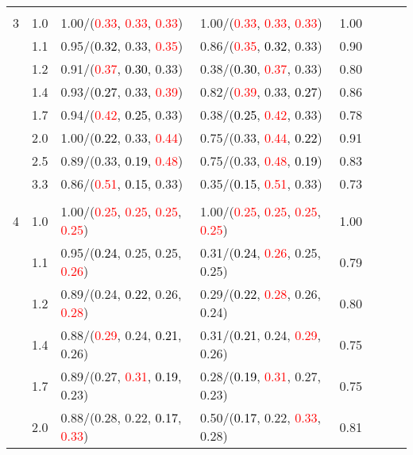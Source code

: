 \documentclass[10pt,a4paper]{report}
\begin{document}
\begin{table}[!htbp]
\begin{center}
{\begin{tabular}{ccllcccc}
			&&&&\\
			3			&1.0&1.00/(\textcolor{red}{0.33}, \textcolor{red}{0.33}, \textcolor{red}{0.33})&1.00/(\textcolor{red}{0.33}, \textcolor{red}{0.33}, \textcolor{red}{0.33})&1.00\\
			&1.1&0.95/(\textcolor{black}{0.32}, 0.33, \textcolor{red}{0.35})&0.86/(\textcolor{red}{0.35}, \textcolor{black}{0.32}, 0.33)&0.90\\
			&1.2&0.91/(\textcolor{red}{0.37}, \textcolor{black}{0.30}, 0.33)&0.38/(\textcolor{black}{0.30}, \textcolor{red}{0.37}, 0.33)&0.80\\
			&1.4&0.93/(\textcolor{black}{0.27}, 0.33, \textcolor{red}{0.39})&0.82/(\textcolor{red}{0.39}, 0.33, \textcolor{black}{0.27})&0.86\\
			&1.7&0.94/(\textcolor{red}{0.42}, \textcolor{black}{0.25}, 0.33)&0.38/(\textcolor{black}{0.25}, \textcolor{red}{0.42}, 0.33)&0.78\\
			&2.0&1.00/(\textcolor{black}{0.22}, 0.33, \textcolor{red}{0.44})&0.75/(0.33, \textcolor{red}{0.44}, \textcolor{black}{0.22})&0.91\\
			&2.5&0.89/(0.33, \textcolor{black}{0.19}, \textcolor{red}{0.48})&0.75/(0.33, \textcolor{red}{0.48}, \textcolor{black}{0.19})&0.83\\
			&3.3&0.86/(\textcolor{red}{0.51}, \textcolor{black}{0.15}, 0.33)&0.35/(\textcolor{black}{0.15}, \textcolor{red}{0.51}, 0.33)&0.73\\
			&&&&\\
			4			&1.0&1.00/(\textcolor{red}{0.25}, \textcolor{red}{0.25}, \textcolor{red}{0.25}, \textcolor{red}{0.25})&1.00/(\textcolor{red}{0.25}, \textcolor{red}{0.25}, \textcolor{red}{0.25}, \textcolor{red}{0.25})&1.00\\
			&1.1&0.95/(\textcolor{black}{0.24}, 0.25, 0.25, \textcolor{red}{0.26})&0.31/(\textcolor{black}{0.24}, \textcolor{red}{0.26}, 0.25, 0.25)&0.79\\
			&1.2&0.89/(0.24, \textcolor{black}{0.22}, 0.26, \textcolor{red}{0.28})&0.29/(\textcolor{black}{0.22}, \textcolor{red}{0.28}, 0.26, 0.24)&0.80\\
			&1.4&0.88/(\textcolor{red}{0.29}, 0.24, \textcolor{black}{0.21}, 0.26)&0.31/(\textcolor{black}{0.21}, 0.24, \textcolor{red}{0.29}, 0.26)&0.75\\
			&1.7&0.89/(0.27, \textcolor{red}{0.31}, \textcolor{black}{0.19}, 0.23)&0.28/(\textcolor{black}{0.19}, \textcolor{red}{0.31}, 0.27, 0.23)&0.75\\
			&2.0&0.88/(0.28, 0.22, \textcolor{black}{0.17}, \textcolor{red}{0.33})&0.50/(\textcolor{black}{0.17}, 0.22, \textcolor{red}{0.33}, 0.28)&0.81\\

\end{tabular}}
\end{center}
\end{table}
\end{document}
